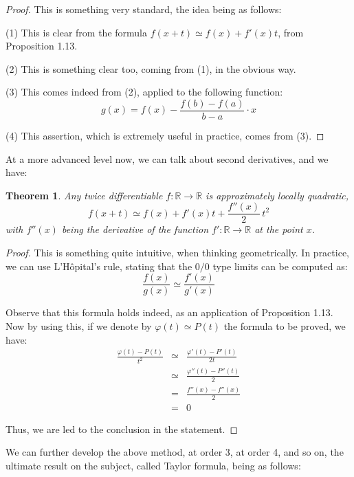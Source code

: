 \documentclass[12pt]{amsbook}
\newtheorem{theorem}{Theorem}[chapter]
\begin{document}
\begin{proof}
This is something very standard, the idea being as follows:

\medskip

(1) This is clear from the formula $f(x+t)\simeq f(x)+f'(x)t$, from Proposition 1.13.

\medskip

(2) This is something clear too, coming from (1), in the obvious way.

\medskip

(3) This comes indeed from (2), applied to the following function:
$$g(x)=f(x)-\frac{f(b)-f(a)}{b-a}\cdot x$$

(4) This assertion, which is extremely useful in practice, comes from (3).
\end{proof}

At a more advanced level now, we can talk about second derivatives, and we have:


\begin{theorem}
Any twice differentiable $f:\mathbb R\to\mathbb R$ is approximately locally quadratic,
$$f(x+t)\simeq f(x)+f'(x)t+\frac{f''(x)}{2}\,t^2$$
with $f''(x)$ being the derivative of the function $f':\mathbb R\to\mathbb R$ at the point $x$.
\end{theorem}

\begin{proof}
This is something quite intuitive, when thinking geometrically. In practice, we can use L'H\^opital's rule, stating that the $0/0$ type limits can be computed as:
$$\frac{f(x)}{g(x)}\simeq\frac{f'(x)}{g'(x)}$$

Observe that this formula holds indeed, as an application of Proposition 1.13. Now by using this, if we denote by $\varphi(t)\simeq P(t)$ the formula to be proved, we have:
\begin{eqnarray*}
\frac{\varphi(t)-P(t)}{t^2}
&\simeq&\frac{\varphi'(t)-P'(t)}{2t}\\
&\simeq&\frac{\varphi''(t)-P''(t)}{2}\\
&=&\frac{f''(x)-f''(x)}{2}\\
&=&0
\end{eqnarray*}

Thus, we are led to the conclusion in the statement.
\end{proof}

We can further develop the above method, at order 3, at order 4, and so on, the ultimate result on the subject, called Taylor formula, being as follows:
\end{document}
